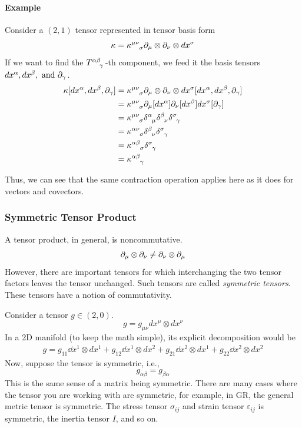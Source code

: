	\paragraph{Example} Consider a $(2,1)$ tensor represented in tensor basis form
	\[
		\kappa = \tensor{\kappa}{^{\mu\nu}_{\sigma}} \p_\mu \otimes \p_\nu \otimes dx^\sigma
	\]
	If we want to find the $\tensor{T}{^{\alpha\beta}_\gamma}$-th component, we feed it the 
	basis tensors $dx^\alpha, dx^\beta,\text{ and }\partial_\gamma$. 
	\begin{align*}
		\kappa
		[dx^\alpha,dx^\beta, \p_\gamma] 
		&= 
		\tensor{\kappa}{^{\mu\nu}_{\sigma}} 
		\p_\mu \otimes \p_\nu \otimes dx^\sigma
		[dx^\alpha,dx^\beta, \p_\gamma] \\
		&=
		\tensor{\kappa}{^{\mu\nu}_{\sigma}} 
		\p_\mu[dx^\alpha]
		\p_\nu[dx^\beta]
		dx^\sigma[\p_\gamma]\\
		&=
		\tensor{\kappa}{^{\mu\nu}_{\sigma}} 
		\tensor{\delta}{^\alpha_\mu}
		\tensor{\delta}{^\beta_\nu}
		\tensor{\delta}{^\sigma_\gamma}\\
		&=
		\tensor{\kappa}{^{\alpha\nu}_{\sigma}} 
		\tensor{\delta}{^\beta_\nu}
		\tensor{\delta}{^\sigma_\gamma}\\
		&=
		\tensor{\kappa}{^{\alpha\beta}_{\sigma}} 
		\tensor{\delta}{^\sigma_\gamma}
		\\
		&=
		\tensor{\kappa}{^{\alpha\beta}_{\gamma}} 
	\end{align*}
	
	Thus, we can see that the same contraction operation applies here as it 
	does for vectors and covectors.
\subsubsection{Symmetric Tensor Product}
	A tensor product, in general, is noncommutative.
	\[
		\partial_\mu \otimes \partial_\nu \neq \partial_\nu \otimes \partial_\mu
	\]
	However, there are important tensors for which interchanging the
	two tensor factors leaves the tensor unchanged. Such tensors are
	called \textit{symmetric tensors}. These tensors have a notion of commutativity.	

	Consider a tensor $g\in(2,0)$. 
	\[
		g = 
		g_{\mu\nu} dx^\mu \otimes dx^\nu
	\]
	In a 2D manifold (to keep the math simple), its explicit decomposition
	would be
	\begin{align*}
		g = 
		g_{11} \dd{x}^1 \otimes dx^1 +
		g_{12} \dd{x}^1 \otimes dx^2 +
		g_{21} \dd{x}^2 \otimes dx^1 +
		g_{22} \dd{x}^2 \otimes dx^2
	\end{align*}
	Now, suppose the tensor is symmetric, i.e.,
	\[
		g_{\alpha\beta} = g_{\beta\alpha} 
	\]
	This is the same sense of a matrix being symmetric. There
	are many cases where the tensor you are working with are symmetric,
	for example, in GR, the general metric tensor is symmetric. The 
	stress tensor $\sigma_{ij}$ and strain tensor $\varepsilon_{ij}$ is symmetric, the inertia tensor $I$, 
	and so on.

